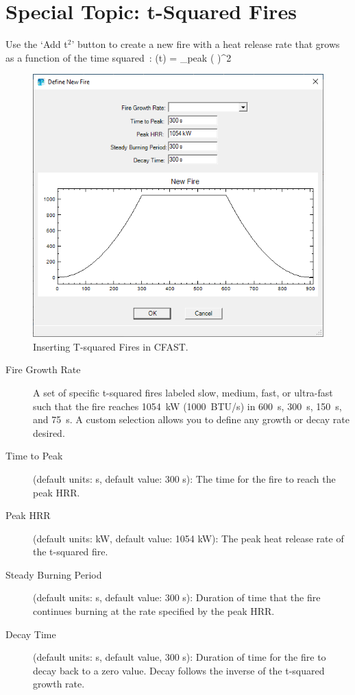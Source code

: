 \section{Special Topic: t-Squared Fires}
\label{tsq}
Use the `Add t$^2$' button to create a new fire with a heat release rate that grows as a function of the time squared~\cite{Schifiliti:2002}:
\be
   \dQ(t) = \dQ_{\rm peak} \; \left(  \right)^2
\ee

\begin{figure}[h!]
\begin{center}
\includegraphics[width=5in]{FIGURES/Create_t2}
\caption[Inserting T-squared Fires in CFAST]{Inserting T-squared Fires in CFAST.}
\end{center}
\end{figure}

\begin{description}
\item[Fire Growth Rate] A set of specific t-squared fires labeled slow, medium, fast, or ultra-fast such that the fire reaches 1054~kW (1000~BTU/s) in 600~s, 300~s, 150~s, and 75~s.  A custom selection allows you to define any growth or decay rate desired.
\item[Time to Peak] (default units: s, default value: 300 s): The time for the fire to reach the peak HRR.
\item[Peak HRR] (default units: kW, default value: 1054 kW): The peak heat release rate of the t-squared fire.
\item[Steady Burning Period] (default units: s, default value: 300 s): Duration of time that the fire continues burning at the rate specified by the peak HRR.
\item[Decay Time] (default units: s, default value, 300 s): Duration of time for the fire to decay back to a zero value.  Decay follows the inverse of the t-squared growth rate.
\end{description}

